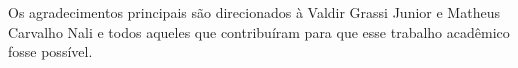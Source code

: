 Os agradecimentos principais são direcionados à Valdir Grassi Junior e Matheus Carvalho Nali e todos aqueles que
contribuíram para que esse trabalho acadêmico fosse possível.
